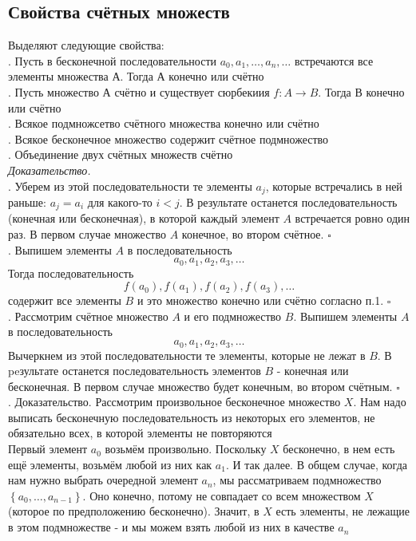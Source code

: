 \documentclass[a4paper]{article}
\newcommand{\qed}{\hfill$\square$}
\begin{document}
\subsection{Свойства счётных множеств}
\label{sec:2.30}Выделяют следующие свойства:\\[2mm]
. Пусть в бесконечной последовательности $a_{0}, a_{1}, \ldots, a_{n}, \ldots$
встречаются все элементы множества А. Тогда А конечно или счётно\\[2mm]
. Пусть множество А счётно и существует сюрбекиия $f: A \rightarrow B$. Тогда В конечно или счётно\\[2mm]
. Всякое подмножсетво счётного множества конечно или счётно\\[2mm]
. Всякое бесконечное множество содержит счётное подмножество\\[2mm]
. Объединение двух счётных множеств счётно\\[2mm]
\textit{Доказательство.}\\[2mm]
. Уберем из этой последовательности те элементы $a_{j}$, которые встречались в ней раньше: $a_{j}=a_{i}$ для какого-то $i<j$. В результате останется последовательность (конечная или бесконечная), в которой каждый элемент $A$ встречается ровно один раз. В первом случае множество $A$ конечное, во втором счётное. \qed\\[2mm]
. Выпишем элементы $A$ в последовательность
$$
a_{0}, a_{1}, a_{2}, a_{3}, \ldots
$$
Тогда последовательность
$$
f\left(a_{0}\right), f\left(a_{1}\right), f\left(a_{2}\right), f\left(a_{3}\right), \ldots
$$
содержит все элементы $B$ и это множество конечно или счётно согласно п.1. \qed\\[2mm]
. Рассмотрим счётное множество $A$ и его подмножество $B$. Выпишем элементы $A$ в последовательность
$$
a_{0}, a_{1}, a_{2}, a_{3}, \ldots
$$
Вычеркнем из этой последовательности те элементы, которые не лежат в $B$. В peзультате останется последовательность элементов $B$ - конечная или бесконечная. В первом случае множество будет конечным, во втором счётным. \qed\\[2mm]
. Доказательство. Рассмотрим произвольное бесконечное множество $X$. Нам надо выписать бесконечную последовательность из некоторых его элементов, не обязательно всех, в которой элементы не повторяются\\[2mm]
\indent Первый элемент $a_{0}$ возьмём произвольно. Поскольку $X$ бесконечно, в нем есть ещё элементы, возьмём любой из них как $a_{1}$. И так далее. В общем случае, когда нам нужно выбрать очередной элемент $a_{n}$, мы рассматриваем подмножество $\left\{a_{0}, \ldots, a_{n-1}\right\}$. Оно конечно, потому не совпадает со всем множеством $X$ (которое по предположению бесконечно). Значит, в $X$ есть элементы, не лежащие в этом подмножестве - и мы можем взять любой из них в качестве $a_{n}$\\[2mm]
\end{document}

